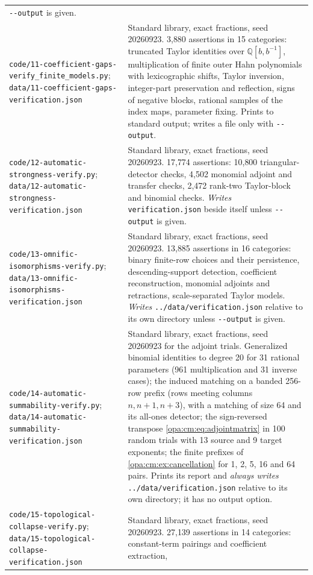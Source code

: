\documentclass[11pt,oneside]{article}
\numberwithin{equation}{section}
\theoremstyle{definition}
\theoremstyle{remark}
\newcommand{\Q}{\mathbb Q}
\newcommand{\fn}[1]{\nolinkurl{#1}}
\begin{document}
\begin{center}
\begin{longtable}{>{\raggedright\arraybackslash}p{}>{\raggedright\arraybackslash}p{}}
\fn{--output} is given.\\
\fn{code/11-coefficient-gaps-verify_finite_models.py};
\fn{data/11-coefficient-gaps-verification.json} & Standard library, exact fractions, seed
20260923. 3{,}880 assertions in 15 categories: truncated Taylor identities over
$\Q[b,b^{-1}]$, multiplication of finite outer Hahn polynomials with lexicographic shifts,
Taylor inversion, integer-part preservation and reflection, signs of negative blocks, rational
samples of the index maps, parameter fixing. Prints to standard output; writes a file only
with \fn{--output}.\\
\fn{code/12-automatic-strongness-verify.py};
\fn{data/12-automatic-strongness-verification.json} & Standard library, exact fractions,
seed 20260923. 17{,}774 assertions: 10{,}800 triangular-detector checks, 4{,}502 monomial
adjoint and transfer checks, 2{,}472 rank-two Taylor-block and binomial checks. \emph{Writes}
\fn{verification.json} beside itself unless \fn{--output} is given.\\
\fn{code/13-omnific-isomorphisms-verify.py};
\fn{data/13-omnific-isomorphisms-verification.json} & Standard library, exact fractions,
seed 20260923. 13{,}885 assertions in 16 categories: binary finite-row choices and their
persistence, descending-support detection, coefficient reconstruction, monomial adjoints and
retractions, scale-separated Taylor models. \emph{Writes} \fn{../data/verification.json}
relative to its own directory unless \fn{--output} is given.\\
\fn{code/14-automatic-summability-verify.py};
\fn{data/14-automatic-summability-verification.json} & Standard library, exact fractions,
seed 20260923 for the adjoint trials. Generalized binomial identities to degree 20 for 31
rational parameters (961 multiplication and 31 inverse cases); the induced matching on a
banded 256-row prefix (rows meeting columns $n,n+1,n+3$), with a matching of size 64 and its
all-ones detector; the sign-reversed transpose \eqref{opa:cm:eq:adjointmatrix} in 100 random
trials with 13 source and 9 target exponents; the finite prefixes of \cref{opa:cm:ex:cancellation} for 1, 2, 5,
16 and 64 pairs. Prints its report and \emph{always writes} \fn{../data/verification.json}
relative to its own directory; it has no output option.\\
\fn{code/15-topological-collapse-verify.py};
\fn{data/15-topological-collapse-verification.json} & Standard library, exact fractions, seed
20260923. 27{,}139 assertions in 14 categories: constant-term pairings and coefficient extraction,

\end{longtable}
\end{center}
\end{document}
